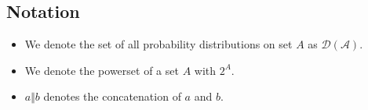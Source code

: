\subsection{Notation}
  \begin{itemize}
    \item We denote the set of all probability distributions on set $A$ as
    $\mathcal{D\left(A\right)}$.
    \item We denote the powerset of a set $A$ with $2^A$.
    \item $a \Vert b$ denotes the concatenation of $a$ and $b$.
  \end{itemize}
